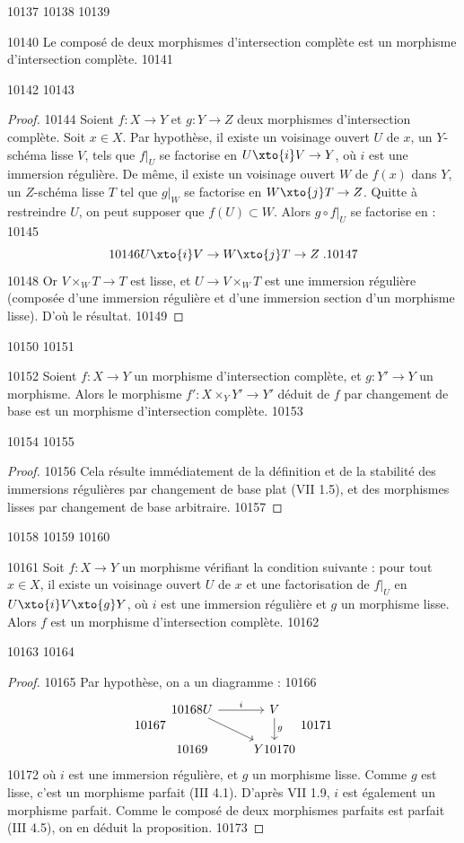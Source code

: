  10137	
 10138	
 10139	\begin{proposition}[1.4]%
 10140	Le composé de deux morphismes d'intersection complète est un morphisme d'intersection complète.
 10141	\end{proposition}
 10142	
 10143	\begin{proof}
 10144	Soient $f : X \to Y$ et $g : Y \to Z$ deux morphismes d'intersection complète. Soit $x \in X$. Par hypothèse, il existe un voisinage ouvert $U$ de $x$, un $Y$-schéma lisse $V$, tels que $f|_U$ se factorise en $U \xto{i} V \to Y$, où $i$ est une immersion régulière. De même, il existe un voisinage ouvert $W$ de $f(x)$ dans $Y$, un $Z$-schéma lisse $T$ tel que $g|_W$ se factorise en $W \xto{j} T \to Z$. Quitte à restreindre $U$, on peut supposer que $f(U) \subset W$. Alors $g \circ f|_U$ se factorise en :
 10145	\[
 10146	U \xto{i} V \to W \xto{j} T \to Z\; .
 10147	\]
 10148	Or $V \times_W T \to T$ est lisse, et $U \to V \times_W T$ est une immersion régulière (composée d'une immersion régulière et d'une immersion section d'un morphisme lisse). D'où le résultat.
 10149	\end{proof}
 10150	
 10151	\begin{proposition}[1.5]%
 10152	Soient $f : X \to Y$ un morphisme d'intersection complète, et $g : Y' \to Y$ un morphisme. Alors le morphisme $f' : X \times_Y Y' \to Y'$ déduit de $f$ par changement de base est un morphisme d'intersection complète.
 10153	\end{proposition}
 10154	
 10155	\begin{proof}
 10156	Cela résulte immédiatement de la définition et de la stabilité des immersions régulières par changement de base plat (VII 1.5), et des morphismes lisses par changement de base arbitraire.
 10157	\end{proof}
 10158	
 10159	
 10160	\begin{proposition}[1.6]%
 10161	Soit $f : X \to Y$ un morphisme vérifiant la condition suivante : pour tout $x \in X$, il existe un voisinage ouvert $U$ de $x$ et une factorisation de $f|_U$ en $U \xto{i} V \xto{g} Y$, où $i$ est une immersion régulière et $g$ un morphisme lisse. Alors $f$ est un morphisme d'intersection complète.
 10162	\end{proposition}
 10163	
 10164	\begin{proof}
 10165	Par hypothèse, on a un diagramme :
 10166	\[
 10167	\begin{tikzcd}
 10168	U \arrow[r, "i"] \arrow[dr] & V \arrow[d, "g"] \\
 10169	& Y
 10170	\end{tikzcd}
 10171	\]
 10172	où $i$ est une immersion régulière, et $g$ un morphisme lisse. Comme $g$ est lisse, c'est un morphisme parfait (III 4.1). D'après VII 1.9, $i$ est également un morphisme parfait. Comme le composé de deux morphismes parfaits est parfait (III 4.5), on en déduit la proposition.
 10173	\end{proof}
